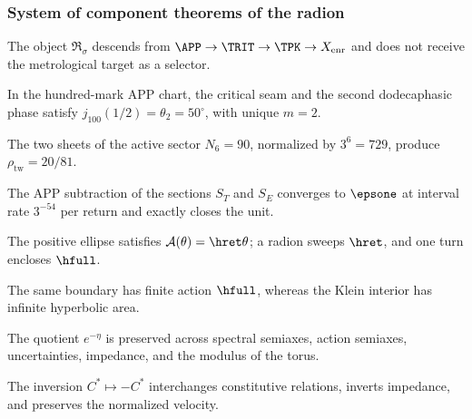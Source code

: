 \subsubsection{System of component theorems of the radion}

\begin{theorem}[Genealogy]
The object \(\mathfrak R_\sigma\) descends from
\(\APP\to\TRIT\to\TPK\to X_{\mathrm{enr}}\) and does not receive the metrological target
as a selector.
\end{theorem}

\begin{theorem}[Hinge]
In the hundred-mark APP chart, the critical seam and the second
dodecaphasic phase satisfy \(j_{100}(1/2)=\theta_2=50^\circ\), with unique \(m=2\).
\end{theorem}

\begin{theorem}[Density]
The two sheets of the active sector \(N_6=90\), normalized by \(3^6=729\),
produce \(\rho_{\mathrm{tw}}=20/81\).
\end{theorem}

\begin{theorem}[Carry]
The APP subtraction of the sections \(S_T\) and \(S_E\) converges to
\(\epsone\) at interval rate \(3^{-54}\) per return and exactly closes
the unit.
\end{theorem}

\begin{theorem}[Action]
The positive ellipse satisfies \(\mathcal A(\theta)=\hret\theta\); a radion
sweeps \(\hret\), and one turn encloses \(\hfull\).
\end{theorem}

\begin{theorem}
The same boundary has finite action \(\hfull\), whereas the Klein
interior has infinite hyperbolic area.
\end{theorem}

\begin{theorem}[Form]
The quotient \(e^{-\eta}\) is preserved across spectral semiaxes,
action semiaxes, uncertainties, impedance, and the modulus of the torus.
\end{theorem}

\begin{theorem}[Polarity]
The inversion \(C^*\mapsto-C^*\) interchanges constitutive relations, inverts
impedance, and preserves the normalized velocity.
\end{theorem}

